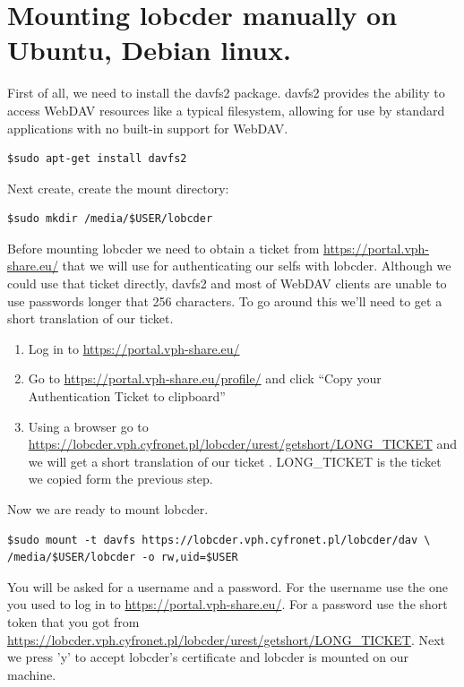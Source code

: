 \documentclass[a4paper,10pt]{report}
\title{}
\author{S. Koulouzis}
\begin{document}
\maketitle
\section{Mounting lobcder manually on Ubuntu, Debian linux.}


First of all, we need to install the davfs2 package. davfs2 provides the ability to access WebDAV resources like a typical filesystem, allowing for use by standard applications with no built-in support for WebDAV. 

\begin{lstlisting}
$sudo apt-get install davfs2
\end{lstlisting}


Next create, create the mount directory:

\begin{lstlisting}
$sudo mkdir /media/$USER/lobcder
\end{lstlisting}

Before mounting lobcder we need to obtain a ticket from \url{https://portal.vph-share.eu/} that we will use for authenticating our selfs with lobcder. Although we could use that ticket directly, davfs2 and most of WebDAV clients are unable to use passwords longer that 256 characters. To go around this we'll need to get a short translation of our ticket.

\begin{enumerate}
 \item Log in to \url{https://portal.vph-share.eu/}
 \item Go to \url{https://portal.vph-share.eu/profile/} and click ``Copy your Authentication Ticket to clipboard''
 \item Using a browser go to \url{https://lobcder.vph.cyfronet.pl/lobcder/urest/getshort/LONG\_TICKET} and we will get a short translation of our ticket . LONG\_TICKET is the ticket we copied form the previous step.
\end{enumerate}

Now we are ready to mount lobcder. 

\begin{lstlisting}
$sudo mount -t davfs https://lobcder.vph.cyfronet.pl/lobcder/dav \
/media/$USER/lobcder -o rw,uid=$USER
\end{lstlisting}

You will be asked for a username and a password. For the username use the one you used to log in to \url{https://portal.vph-share.eu/}. For a password use the short token that you got from \url{https://lobcder.vph.cyfronet.pl/lobcder/urest/getshort/LONG_TICKET}. 
Next we press 'y' to accept lobcder's certificate and lobcder is mounted on our machine. 
\end{document}
